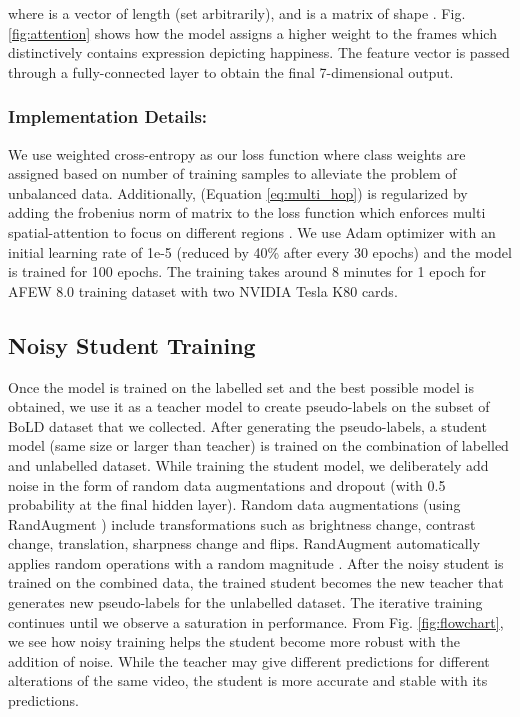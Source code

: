 \documentclass[runningheads]{llncs}
\begin{document}
where  is a vector of length  (set arbitrarily), and  is a matrix of shape . Fig. \ref{fig:attention} shows how the model assigns a higher weight to the frames which distinctively contains expression depicting happiness. The feature vector  is passed through a fully-connected layer to obtain the final 7-dimensional output. 

\subsubsection{Implementation Details:}
We use weighted cross-entropy as our loss function where class weights are assigned based on number of training samples to alleviate the problem of unbalanced data. Additionally,  (Equation \ref{eq:multi_hop}) is regularized by adding the frobenius norm of matrix  to the loss function which enforces multi spatial-attention to focus on different regions \cite{lin2017structured}. We use Adam optimizer with an initial learning rate of 1e-5 (reduced by 40\% after every 30 epochs) and the model is trained for 100 epochs. The training takes around 8 minutes for 1 epoch for AFEW 8.0 training dataset with two NVIDIA Tesla K80 cards.

\subsection{Noisy Student Training \cite{xie2019self}} \label{sec: student}
Once the model is trained on the labelled set and the best possible model is obtained, we use it as a teacher model to create pseudo-labels on the subset of BoLD dataset that we collected. After generating the pseudo-labels, a student model (same size or larger than teacher) is trained on the combination of labelled and unlabelled dataset. While training the student model, we deliberately add noise in the form of random data augmentations and dropout (with 0.5 probability at the final hidden layer). Random data augmentations (using RandAugment \cite{cubuk2019randaugment}) include transformations such as brightness change, contrast change, translation, sharpness change and flips. RandAugment automatically applies  random operations with a random magnitude . After the noisy student is trained on the combined data, the trained student becomes the new teacher that generates new pseudo-labels for the unlabelled dataset. The iterative training continues until we observe a saturation in performance. From Fig. \ref{fig:flowchart}, we see how noisy training helps the student become more robust with the addition of noise. While the teacher may give different predictions for different alterations of the same video, the student is more accurate and stable with its predictions.
\end{document}
